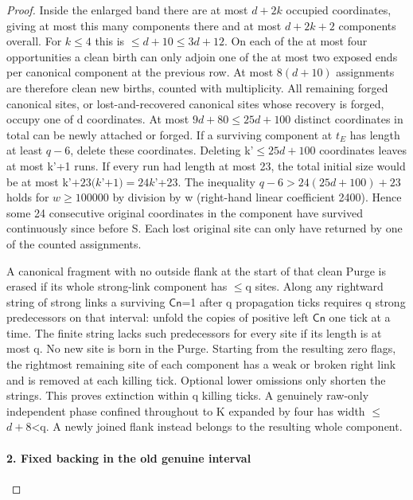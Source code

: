 \begin{proof}
Inside the enlarged band there are at most \(d+2k\) occupied coordinates, giving at most this many components there and at most \(d+2k+2\) components overall. For \(k\le 4\) this is \(\le\)\(d+10\)\(\le\)\(3d+12\). On each of the at most four opportunities a clean birth can only adjoin one of the at most two exposed ends per canonical component at the previous row. At most \(8(d+10)\) assignments are therefore clean new births, counted with multiplicity. All remaining forged canonical sites, or lost-and-recovered canonical sites whose recovery is forged, occupy one of d coordinates. At most \(9d+80\le 25d+100\) distinct coordinates in total can be newly attached or forged. If a surviving component at \(t_E\) has length at least \(q- 6\), delete these coordinates. Deleting k'\(\le\)\(25d+100\) coordinates leaves at most k'+1 runs. If every run had length at most 23, the total initial size would be at most k'\(+23(k\)'\(+1)=24k\)'+23. The inequality \(q- 6>24(25d+100)+23\) holds for \(w\ge 100000\) by division by w (right-hand linear coefficient 2400). Hence some 24 consecutive original coordinates in the component have survived continuously since before S. Each lost original site can only have returned by one of the counted assignments.

A canonical fragment with no outside flank at the start of that clean Purge is erased if its whole strong-link component has \(\le\)q sites. Along any rightward string of strong links a surviving \(\mathsf{Cn}\)=1 after q propagation ticks requires q strong predecessors on that interval: unfold the copies of positive left \(\mathsf{Cn}\) one tick at a time. The finite string lacks such predecessors for every site if its length is at most q. No new site is born in the Purge. Starting from the resulting zero flags, the rightmost remaining site of each component has a weak or broken right link and is removed at each killing tick. Optional lower omissions only shorten the strings. This proves extinction within q killing ticks. A genuinely raw-only independent phase confined throughout to K expanded by four has width \(\le\)\(d+8\)\textless{}q. A newly joined flank instead belongs to the resulting whole component.

\paragraph{2. Fixed backing in the old genuine interval}


\end{proof}
